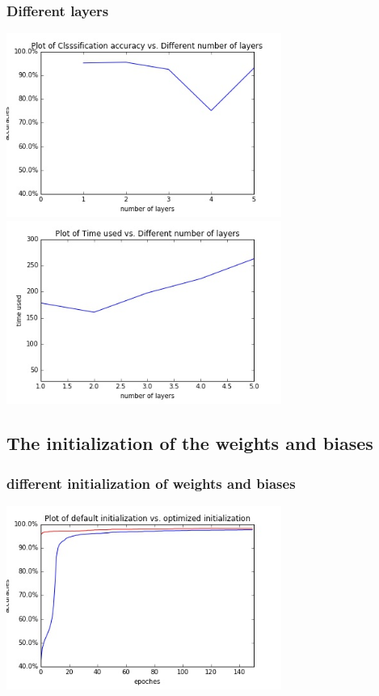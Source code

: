 \documentclass[12pt,a4paper]{article}
\begin{document}
\subsubsection{Different layers}
\includegraphics[width=90mm,scale=1]{p103.jpg}\\
\includegraphics[width=90mm,scale=1]{p104.jpg}\\
\subsection{The initialization of the weights and biases}

\subsubsection{different initialization of weights and biases}
\includegraphics[width=90mm,scale=1]{p201.jpg}\\
\end{document}
